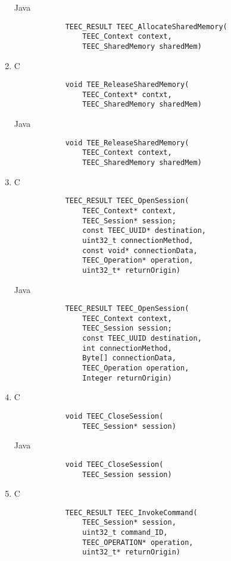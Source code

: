 \documentclass{cseminar}
\begin{document}
\begin{enumerate}
		  Java
		  	\begin{lstlisting}
		  	TEEC_RESULT TEEC_AllocateSharedMemory(
				TEEC_Context context,
				TEEC_SharedMemory sharedMem)
			\end{lstlisting}


	\item C
			\begin{lstlisting}
			void TEE_ReleaseSharedMemory(
				TEEC_Context* contxt,
				TEEC_SharedMemory sharedMem)
			\end{lstlisting}
		  
		  Java
		  	\begin{lstlisting}
		  	void TEE_ReleaseSharedMemory(
				TEEC_Context context,
				TEEC_SharedMemory sharedMem)
			\end{lstlisting}


	\item C
			\begin{lstlisting}
			TEEC_RESULT TEEC_OpenSession(
				TEEC_Context* context,
				TEEC_Session* session;
				const TEEC_UUID* destination,
				uint32_t connectionMethod,
				const void* connectionData,
				TEEC_Operation* operation,
				uint32_t* returnOrigin)
			\end{lstlisting}
		  
		  Java
		  	\begin{lstlisting}
		  	TEEC_RESULT TEEC_OpenSession(
				TEEC_Context context,
				TEEC_Session session;
				const TEEC_UUID destination,
				int connectionMethod,
				Byte[] connectionData,
				TEEC_Operation operation,
				Integer returnOrigin)
			\end{lstlisting}


	\item C
			\begin{lstlisting}
			void TEEC_CloseSession(
				TEEC_Session* session)
			\end{lstlisting}
		  
		  Java
		  	\begin{lstlisting}
		  	void TEEC_CloseSession(
				TEEC_Session session)
			\end{lstlisting}



	\item C
			\begin{lstlisting}
			TEEC_RESULT TEEC_InvokeCommand(
				TEEC_Session* session,
				uint32_t command_ID,
				TEEC_OPERATION* operation,
				uint32_t* returnOrigin)
			\end{lstlisting}
		  

\end{enumerate}
\end{document}
